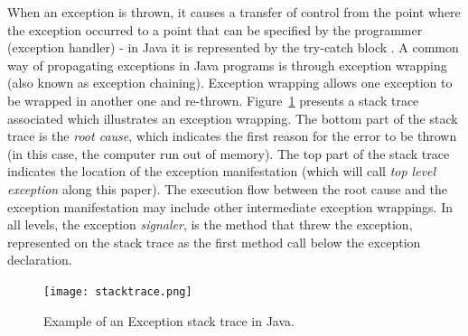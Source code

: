 \documentclass[conference]{IEEEtran}
\begin{document}

When an exception is thrown, it causes a transfer of control from the point
where the exception occurred to a point that can be specified by the programmer
(exception handler) - in Java it is represented by the try-catch block . A common way of  
propagating exceptions in Java programs is through exception wrapping
 (also known as exception chaining). Exception wrapping allows one exception 
to be wrapped in another one and re-thrown. Figure~\ref{fig:wrapping} presents 
a stack trace associated which illustrates an exception wrapping. The bottom 
part of the stack trace is the \emph{root cause}, which indicates the
first reason for the error to be thrown (in this case, the computer run out of
memory). The top part of the stack trace indicates the location of the exception
manifestation (which will call \emph{top level exception} along this paper). The
execution flow  between the root cause and the exception manifestation may
include other intermediate exception wrappings. In all levels, the exception
\emph{signaler}, is the method that threw the exception, represented on the
stack trace as the first method call below the exception declaration.

\begin{figure} \centering \texttt{[image: stacktrace.png]}
\caption{Example of an Exception stack trace in Java.}
\label{fig:wrapping}
\end{figure}

\end{document}
